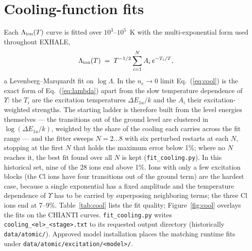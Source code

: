 \documentclass[english,a4paper]{my_memo}
\newcommand{\Lam}{\Lambda}
\newcommand{\code}[1]{\texttt{#1}}
\begin{document}
\section{Cooling-function fits}
Each $\Lam_{\rm ion}(T)$ curve is fitted over $10^3\mbox{--}10^5$~K with
the multi-exponential form used throughout EXHALE,
\begin{equation}
  \Lam_{\rm ion}(T) \;=\; T^{-1/2} \sum_{i=1}^{N} A_i\, e^{-T_i/T},
  \label{eq:cool}
\end{equation}
a Levenberg--Marquardt fit on $\log\Lam$.  In the $n_e \to 0$ limit
Eq.~(\ref{eq:cool}) is the exact form of Eq.~(\ref{eq:lambda}) apart
from the slow temperature dependence of $\Upsilon$: the $T_i$ are the
excitation temperatures $\Delta E_{1u}/k$ and the $A_i$ their
excitation-weighted strengths.  The starting ladder is therefore built
from the level energies themselves --- the transitions out of the ground
level are clustered in $\log(\Delta E_{1u}/k)$, weighted by the share of
the cooling each carries across the fit range --- and the fitter sweeps
$N = 2\ldots8$ with six perturbed restarts at each $N$, stopping at the
first $N$ that holds the maximum error below 1\%; where no $N$ reaches
it, the best fit found over all $N$ is kept (\code{fit\_cooling.py}).
In this historical set, nine of the 28 ions end above 1\%.  Ions with only a few excitation
blocks (the Cl ions have four transitions out of the ground term) are
the hardest case, because a single exponential has a fixed amplitude and
the temperature dependence of $\Upsilon$ has to be carried by
superposing neighboring terms; the three Cl ions end at 7--9\%.  Table~\ref{tab:cool} lists the fit
quality; Figure~\ref{fig:cool} overlays the fits on the CHIANTI curves.
\code{fit\_cooling.py} writes \code{cooling\_<el>\_<stage>.txt} to its
requested output directory (historically \code{data/atomic/}).  Approved
model installation places the matching runtime fits under
\code{data/atomic/excitation/<model>/}.
\end{document}
